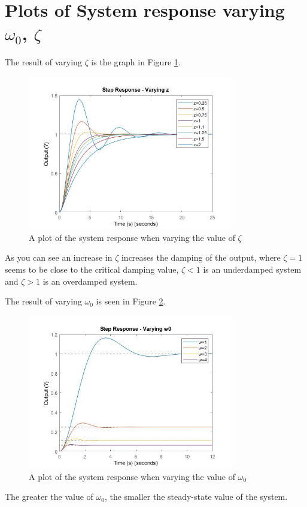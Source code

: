 
\section{Plots of System response varying $\omega_{0}$, $\zeta$}
The result of varying $\zeta$ is the graph in Figure \ref{fig:varying-zeta}.
\begin{figure}[H]
	\centering
	\includegraphics[width=0.8\textwidth]{./figures/lab4_fig1-part4-3-1-z.jpg}
	\caption{A plot of the system response when varying the value of $\zeta$}
	\label{fig:varying-zeta}
\end{figure}
As you can see an increase in $\zeta$ increases the damping of the output, where $\zeta=1$ seems to be close to the critical damping value, $\zeta < 1$ is an underdamped system and $\zeta > 1$ is an overdamped system. 

The result of varying $\omega_{0}$ is seen in Figure \ref{fig:varying-w0}.
\begin{figure}[H]
	\centering
	\includegraphics[width=0.8\textwidth]{./figures/lab4_fig2-part4-3-1-w0.jpg}
	\caption{A plot of the system response when varying the value of $\omega _{0}$}
	\label{fig:varying-w0}
\end{figure}
The greater the value of $\omega_{0}$, the smaller the steady-state value of the system. 
